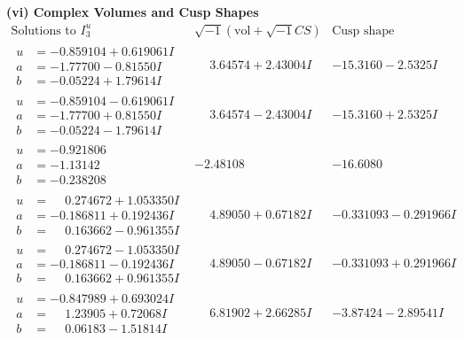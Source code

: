 \documentclass[1p]{elsarticle_modified}
\theoremstyle{definition}
\newcommand{\I}{\sqrt{-1}}
\begin{document}
\newpage\flushleft \textbf{(vi) Complex Volumes and Cusp Shapes}
$$\begin{array}{c|c|c}  
\text{Solutions to }I^u_{3}& \I (\text{vol} + \sqrt{-1}CS) & \text{Cusp shape}\\
 \hline 
\begin{aligned}
u &= -0.859104 + 0.619061 I \\
a &= -1.77700 - 0.81550 I \\
b &= -0.05224 + 1.79614 I\end{aligned}
 & \phantom{-}3.64574 + 2.43004 I & -15.3160 - 2.5325 I \\ \hline\begin{aligned}
u &= -0.859104 - 0.619061 I \\
a &= -1.77700 + 0.81550 I \\
b &= -0.05224 - 1.79614 I\end{aligned}
 & \phantom{-}3.64574 - 2.43004 I & -15.3160 + 2.5325 I \\ \hline\begin{aligned}
u &= -0.921806\phantom{ +0.000000I} \\
a &= -1.13142\phantom{ +0.000000I} \\
b &= -0.238208\phantom{ +0.000000I}\end{aligned}
 & -2.48108\phantom{ +0.000000I} & -16.6080\phantom{ +0.000000I} \\ \hline\begin{aligned}
u &= \phantom{-}0.274672 + 1.053350 I \\
a &= -0.186811 + 0.192436 I \\
b &= \phantom{-}0.163662 - 0.961355 I\end{aligned}
 & \phantom{-}4.89050 + 0.67182 I & -0.331093 - 0.291966 I \\ \hline\begin{aligned}
u &= \phantom{-}0.274672 - 1.053350 I \\
a &= -0.186811 - 0.192436 I \\
b &= \phantom{-}0.163662 + 0.961355 I\end{aligned}
 & \phantom{-}4.89050 - 0.67182 I & -0.331093 + 0.291966 I \\ \hline\begin{aligned}
u &= -0.847989 + 0.693024 I \\
a &= \phantom{-}1.23905 + 0.72068 I \\
b &= \phantom{-}0.06183 - 1.51814 I\end{aligned}
 & \phantom{-}6.81902 + 2.66285 I & -3.87424 - 2.89541 I \\ \hline\begin{aligned}

\end{aligned}
\end{array}$$
\end{document}
